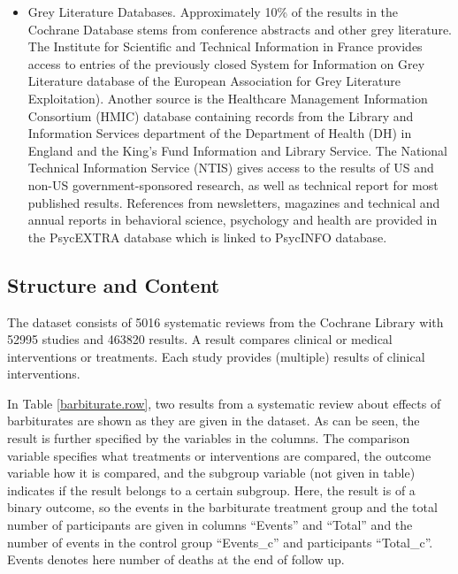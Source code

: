 \documentclass[11pt,a4paper,twoside]{book}\usepackage[]{graphicx}\usepackage[]{color}
\begin{document}
\begin{itemize}
\item Grey Literature Databases. Approximately 10\% of the results in the Cochrane Database stems from conference abstracts and other grey literature. The Institute for Scientific and Technical Information in France provides access to entries of the previously closed System for Information on Grey Literature database of the European Association for Grey Literature Exploitation). Another source is the Healthcare Management Information Consortium (HMIC) database containing records from the Library and Information Services department of the Department of Health (DH) in England and the King's Fund Information and Library Service. The National Technical Information Service (NTIS) gives access to the results of US and non-US government-sponsored research, as well as technical report for most published results. References from newsletters, magazines and technical and annual reports in behavioral science, psychology and health are provided in the PsycEXTRA database which is linked to PsycINFO database.
\end{itemize}






\subsection{Structure and Content}
The dataset consists of 5016 systematic reviews from the Cochrane Library with 52995 studies and 463820 results. A result compares clinical or medical interventions or treatments. Each study provides (multiple) results of clinical interventions. 

In Table \ref{barbiturate.row}, two results from a systematic review about effects of barbiturates are shown as they are given in the dataset. As can be seen, the result is further specified by the variables in the columns. The comparison variable specifies what treatments or interventions are compared, the outcome variable how it is compared, and the subgroup variable (not given in table) indicates if the result belongs to a certain subgroup. Here, the result is of a binary outcome, so the events in the barbiturate treatment group and the total number of participants are given in columns ``Events'' and ``Total'' and the number of events in the control group ``Events\_c'' and participants ``Total\_c''. Events denotes here number of deaths at the end of follow up.
\end{document}
